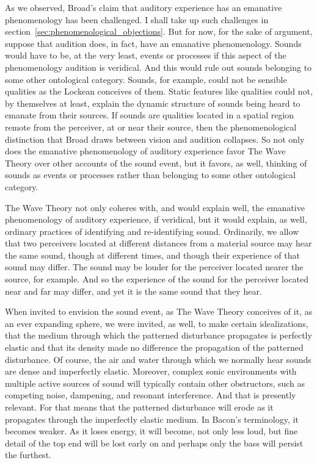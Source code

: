 As we observed, Broad's claim that auditory experience has an emanative phenomenology has been challenged. I shall take up such challenges in section~\ref{sec:phenomenological_objections}. But for now, for the sake of argument, suppose that audition does, in fact, have an emanative phenomenology. Sounds would have to be, at the very least, events or processes if this aspect of the phenomenology audition is veridical. And this would rule out sounds belonging to some other ontological category. Sounds, for example, could not be sensible qualities as the Lockean conceives of them. Static features like qualities could not, by themselves at least, explain the dynamic structure of sounds being heard to emanate from their sources. If sounds are qualities located in a spatial region remote from the perceiver, at or near their source, then the phenomenological distinction that Broad draws between vision and audition collapses. So not only does the emanative phenomenology of auditory experience favor The Wave Theory over other accounts of the sound event, but it favors, as well, thinking of sounds as events or processes rather than belonging to some other ontological category. 

The Wave Theory not only coheres with, and would explain well, the emanative phenomenology of auditory experience, if veridical, but it would explain, as well, ordinary practices of identifying and re-identifying sound. Ordinarily, we allow that two perceivers located at different distances from a material source may hear the same sound, though at different times, and though their experience of that sound may differ. The sound may be louder for the perceiver located nearer the source, for example. And so the experience of the sound for the perceiver located near and far may differ, and yet it is the same sound that they hear. 

When invited to envision the sound event, as The Wave Theory conceives of it, as an ever expanding sphere, we were invited, as well, to make certain idealizations, that the medium through which the patterned disturbance propagates is perfectly elastic and that its density made no difference the propagation of the patterned disturbance. Of course, the air and water through which we normally hear sounds are dense and imperfectly elastic. Moreover, complex sonic environments with multiple active sources of sound will typically contain other obstructors, such as competing noise, dampening, and resonant interference. And that is presently relevant. For that means that the patterned disturbance will erode as it propagates through the imperfectly elastic medium. In Bacon's terminology, it becomes weaker. As it loses energy, it will become, not only less loud, but fine detail of the top end will be lost early on and perhaps only the bass will persist the furthest. 


